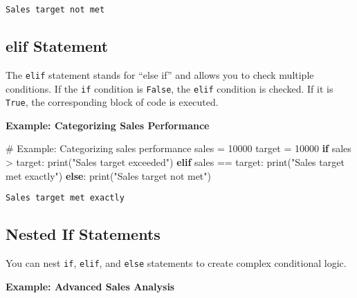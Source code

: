 \documentclass[
  letterpaper,
  DIV=11,
  numbers=noendperiod]{scrreprt}
\newenvironment{Shaded}{\begin{snugshade}}{\end{snugshade}}
\newcommand{\BuiltInTok}[1]{\textcolor[rgb]{0.00,0.23,0.31}{#1}}
\newcommand{\CommentTok}[1]{\textcolor[rgb]{0.37,0.37,0.37}{#1}}
\newcommand{\ControlFlowTok}[1]{\textcolor[rgb]{0.00,0.23,0.31}{\textbf{#1}}}
\newcommand{\DecValTok}[1]{\textcolor[rgb]{0.68,0.00,0.00}{#1}}
\newcommand{\NormalTok}[1]{\textcolor[rgb]{0.00,0.23,0.31}{#1}}
\newcommand{\OperatorTok}[1]{\textcolor[rgb]{0.37,0.37,0.37}{#1}}
\newcommand{\StringTok}[1]{\textcolor[rgb]{0.13,0.47,0.30}{#1}}
\begin{document}
\begin{verbatim}
Sales target not met
\end{verbatim}

\subsection{elif Statement}\label{elif-statement}

The \texttt{elif} statement stands for ``else if'' and allows you to
check multiple conditions. If the \texttt{if} condition is
\texttt{False}, the \texttt{elif} condition is checked. If it is
\texttt{True}, the corresponding block of code is executed.

\textbf{Example: Categorizing Sales Performance}

\begin{Shaded}
\begin{Highlighting}[]
\CommentTok{\# Example: Categorizing sales performance}
\NormalTok{sales }\OperatorTok{=} \DecValTok{10000}
\NormalTok{target }\OperatorTok{=} \DecValTok{10000}
\ControlFlowTok{if}\NormalTok{ sales }\OperatorTok{\textgreater{}}\NormalTok{ target:}
    \BuiltInTok{print}\NormalTok{(}\StringTok{"Sales target exceeded"}\NormalTok{)}
\ControlFlowTok{elif}\NormalTok{ sales }\OperatorTok{==}\NormalTok{ target:}
    \BuiltInTok{print}\NormalTok{(}\StringTok{"Sales target met exactly"}\NormalTok{)}
\ControlFlowTok{else}\NormalTok{:}
    \BuiltInTok{print}\NormalTok{(}\StringTok{"Sales target not met"}\NormalTok{)}
\end{Highlighting}
\end{Shaded}

\begin{verbatim}
Sales target met exactly
\end{verbatim}

\subsection{Nested If Statements}\label{nested-if-statements}

You can nest \texttt{if}, \texttt{elif}, and \texttt{else} statements to
create complex conditional logic.

\textbf{Example: Advanced Sales Analysis}
\end{document}
